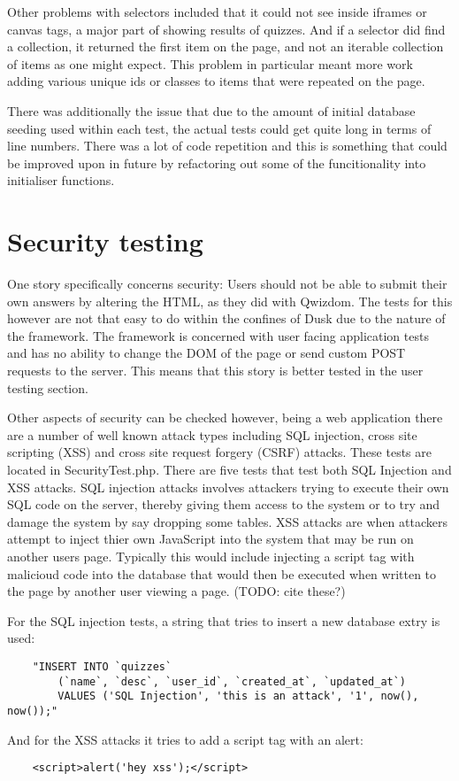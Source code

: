 Other problems with selectors included that it could not see inside iframes or canvas tags, a major part of showing results of quizzes. And if a selector did find a collection, it returned the first item on the page, and not an iterable collection of items as one might expect. This problem in particular meant more work adding various unique ids or classes to items that were repeated on the page.

There was additionally the issue that due to the amount of initial database seeding used within each test, the actual tests could get quite long in terms of line numbers. There was a lot of code repetition and this is something that could be improved upon in future by refactoring out some of the funcitionality into initialiser functions.

\section{Security testing}
One story specifically concerns security: Users should not be able to submit their own answers by altering the HTML, as they did with Qwizdom. The tests for this however are not that easy to do within the confines of Dusk due to the nature of the framework. The framework is concerned with user facing application tests and has no ability to change the DOM of the page or send custom POST requests to the server. This means that this story is better tested in the user testing section.

Other aspects of security can be checked however, being a web application there are a number of well known attack types including SQL injection, cross site scripting (XSS) and cross site request forgery (CSRF) attacks. These tests are located in SecurityTest.php. There are five tests that test both SQL Injection and XSS attacks. SQL injection attacks involves attackers trying to execute their own SQL code on the server, thereby giving them access to the system or to try and damage the system by say dropping some tables. XSS attacks are when attackers attempt to inject thier own JavaScript into the system that may be run on another users page. Typically this would include injecting a script tag with malicioud code into the database that would then be executed when written to the page by another user viewing a page. (TODO: cite these?) 

For the SQL injection tests, a string that tries to insert a new database extry is used:
\begin{verbatim}
	"INSERT INTO `quizzes` 
		(`name`, `desc`, `user_id`, `created_at`, `updated_at`) 
		VALUES ('SQL Injection', 'this is an attack', '1', now(), now());"
\end{verbatim}
And for the XSS attacks it tries to add a script tag with an alert:
\begin{verbatim}
	<script>alert('hey xss');</script>
\end{verbatim} 

